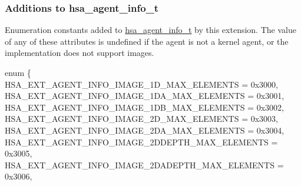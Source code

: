 \documentclass[final,oneside]{book}
\newcommand{\reftyp}[1]{#1}
\newcommand{\refenu}[1]{\reftyp{#1}}
\newenvironment{mylongtable}{\rowcolors{0}{lightgray}{lightgray}\longtable} {
\endlongtable}
\begin{document}
\subsubsection{Additions to hsa_\-agent_\-info_\-t}
\vspace{-2.5mm}Enumeration constants added to \hyperlink{group__agentinfo_1ga39d0684207d95717d96319573b3e4a42}{hsa_\-agent_\-info_\-t} by this extension. The value of any of these attributes is undefined if the agent is not a kernel agent, or the implementation does not support images.\begin{mylongtable}{@{}p{\textwidth}}
\rule{0pt}{3ex}enum \{\\\hspace{1.7em}\hypertarget{group__ext-images_1gga99fb83031ce9923c84392b4e92f956b5aec34e7fe9f6f42ecbc1e72b48956fe5e}{\refenu{HSA_\-EXT_\-AGENT_\-INFO_\-IMAGE_\-1D_\-MAX_\-ELEMENTS}} = 0x3000,\\
\hspace{1.7em}\hypertarget{group__ext-images_1gga99fb83031ce9923c84392b4e92f956b5ab597cd205855caea8a58fbe9256a001f}{\refenu{HSA_\-EXT_\-AGENT_\-INFO_\-IMAGE_\-1DA_\-MAX_\-ELEMENTS}} = 0x3001,\\
\hspace{1.7em}\hypertarget{group__ext-images_1gga99fb83031ce9923c84392b4e92f956b5a145fa8a0ef85752e1e21966f88ffd85f}{\refenu{HSA_\-EXT_\-AGENT_\-INFO_\-IMAGE_\-1DB_\-MAX_\-ELEMENTS}} = 0x3002,\\
\hspace{1.7em}\hypertarget{group__ext-images_1gga99fb83031ce9923c84392b4e92f956b5ac36ca2ff9c2b82444410acc2c05750c7}{\refenu{HSA_\-EXT_\-AGENT_\-INFO_\-IMAGE_\-2D_\-MAX_\-ELEMENTS}} = 0x3003,\\
\hspace{1.7em}\hypertarget{group__ext-images_1gga99fb83031ce9923c84392b4e92f956b5a9ee2d789843a03ae02bbd8cf44465ec6}{\refenu{HSA_\-EXT_\-AGENT_\-INFO_\-IMAGE_\-2DA_\-MAX_\-ELEMENTS}} = 0x3004,\\
\hspace{1.7em}\hypertarget{group__ext-images_1gga99fb83031ce9923c84392b4e92f956b5a15262e3b83a1ff50af219c186b70ccde}{\refenu{HSA_\-EXT_\-AGENT_\-INFO_\-IMAGE_\-2DDEPTH_\-MAX_\-ELEMENTS}} = 0x3005,\\
\hspace{1.7em}\hypertarget{group__ext-images_1gga99fb83031ce9923c84392b4e92f956b5abeb08bb9caae027b3d11d700aff4b306}{\refenu{HSA_\-EXT_\-AGENT_\-INFO_\-IMAGE_\-2DADEPTH_\-MAX_\-ELEMENTS}} = 0x3006,\\

\end{mylongtable}
\end{document}
